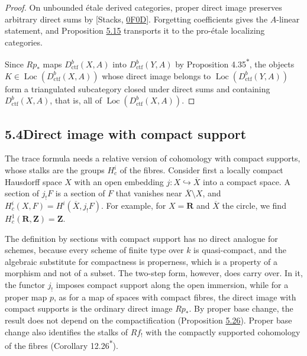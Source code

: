 \documentclass[11pt]{article}
\newcommand{\bpout}[1]{#1\textsuperscript{\hyperlink{bp-outside}{\ensuremath{\ast}}}}
\providecommand{\Loc}{}\renewcommand{\Loc}{\operatorname{Loc}}
\begin{document}
\begin{proof}[{Proof}]\label{bp52}%
On unbounded étale derived categories, proper direct image preserves arbitrary direct sums by [Stacks, \href{https://stacks.math.columbia.edu/tag/0F0D}{0F0D}]. Forgetting coefficients gives the \(A\)-linear statement, and Proposition \hyperref[bp48]{5.15} transports it to the pro-étale localizing categories.

Since \(Rp_*\) maps \(D^b_{\mathrm{ctf}}(X,A)\) into \(D^b_{\mathrm{ctf}}(Y,A)\) by Proposition \bpout{4.35}, the objects \(K\in\Loc(D^b_{\mathrm{ctf}}(X,A))\) whose direct image belongs to \(\Loc(D^b_{\mathrm{ctf}}(Y,A))\) form a triangulated subcategory closed under direct sums and containing \(D^b_{\mathrm{ctf}}(X,A)\), that is, all of \(\Loc(D^b_{\mathrm{ctf}}(X,A))\).
\end{proof}


\subsection*{\texorpdfstring{5.4\quad Direct image with compact support}{5.4 Direct image with compact support}}
\label{bp53}%
\label{bp54}%
The trace formula needs a relative version of cohomology with compact supports, whose stalks are the groups \(H^i_c\) of the fibres. Consider first a locally compact Hausdorff space \(X\) with an open embedding \(j:X\hookrightarrow\overline X\) into a compact space. A section of \(j_!F\) is a section of \(F\) that vanishes near \(\overline X\setminus X\), and \(H^i_c(X,F)=H^i(\overline X,j_!F)\). For example, for \(X=\mathbf R\) and \(\overline X\) the circle, we find \(H^1_c(\mathbf R,\mathbf Z)=\mathbf Z\).

The definition by sections with compact support has no direct analogue for schemes, because every scheme of finite type over \(k\) is quasi-compact, and the algebraic substitute for compactness is properness, which is a property of a morphism and not of a subset. The two-step form, however, does carry over. In it, the functor \(j_!\) imposes compact support along the open immersion, while for a proper map \(p\), as for a map of spaces with compact fibres, the direct image with compact supports is the ordinary direct image \(Rp_*\). By proper base change, the result does not depend on the compactification (Proposition \hyperref[bp86]{5.26}). Proper base change also identifies the stalks of \(Rf_!\) with the compactly supported cohomology of the fibres (Corollary \bpout{12.26}).
\end{document}
